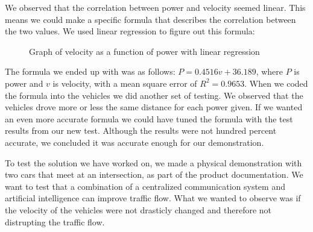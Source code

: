 We observed that the correlation between power and velocity seemed linear. This means we could make a specific formula that describes the correlation between the two values. We used linear regression to figure out this formula:

\begin{figure}[h!]
	\caption{Graph of velocity as a function of power with linear regression}
\end{figure}

The formula we ended up with was as follows: $P = 0.4516v + 36.189$, where $P$ is power and $v$ is velocity, with a mean square error of $R^2=0.9653$. When we coded the formula into the vehicles we did another set of testing. We observed that the vehicles drove more or less the same distance for each power given. If we wanted an even more accurate formula we could have tuned the formula with the test results from our new test. Although the results were not hundred percent accurate, we concluded it was accurate enough for our demonstration. 

To test the solution we have worked on, we made a physical demonstration with two cars that meet at an intersection, as part of the product documentation. We want to test that a combination of a centralized communication system and artificial intelligence can improve traffic flow. What we wanted to observe was if the velocity of the vehicles were not drasticly changed and therefore not distrupting the traffic flow.

